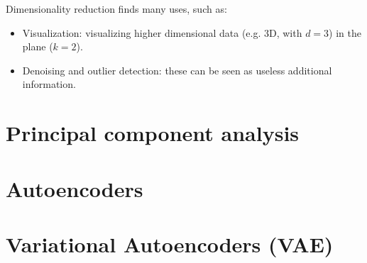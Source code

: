 Dimensionality reduction finds many uses, such as:
\begin{itemize}
	\item Visualization: visualizing higher dimensional data (e.g. 3D, with $d = 3$) in the plane ($k = 2$).
	\item Denoising and outlier detection: these can be seen as useless additional information.
\end{itemize}

\section{Principal component analysis} 

\section{Autoencoders} 

\section{Variational Autoencoders (VAE)}
